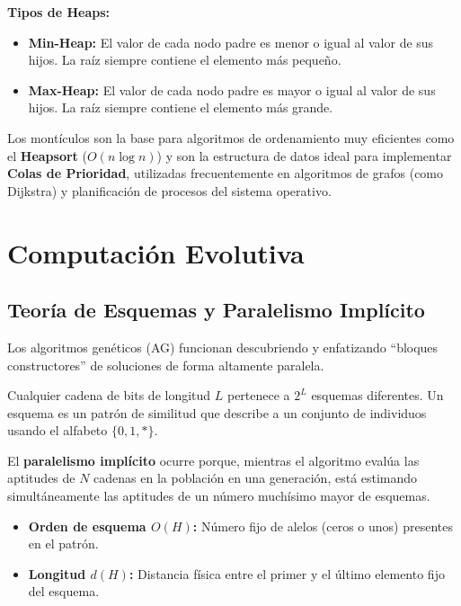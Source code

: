 \documentclass{article}
\begin{document}
	\textbf{Tipos de Heaps:}
	\begin{itemize}
		\item \textbf{Min-Heap:} El valor de cada nodo padre es menor o igual al valor de sus hijos. La raíz siempre contiene el elemento más pequeño.
		\item \textbf{Max-Heap:} El valor de cada nodo padre es mayor o igual al valor de sus hijos. La raíz siempre contiene el elemento más grande.
	\end{itemize}
	
	Los montículos son la base para algoritmos de ordenamiento muy eficientes como el \textbf{Heapsort} ($O(n \log n)$) y son la estructura de datos ideal para implementar \textbf{Colas de Prioridad}, utilizadas frecuentemente en algoritmos de grafos (como Dijkstra) y planificación de procesos del sistema operativo.
	
	
	
	\section{Computación Evolutiva}
	
	\subsection{Teoría de Esquemas y Paralelismo Implícito}
	Los algoritmos genéticos (AG) funcionan descubriendo y enfatizando ``bloques constructores'' de soluciones de forma altamente paralela. 
	
	Cualquier cadena de bits de longitud $L$ pertenece a $2^{L}$ esquemas diferentes. Un esquema es un patrón de similitud que describe a un conjunto de individuos usando el alfabeto $\{0, 1, *\}$. 
	
	El \textbf{paralelismo implícito} ocurre porque, mientras el algoritmo evalúa las aptitudes de $N$ cadenas en la población en una generación, está estimando simultáneamente las aptitudes de un número muchísimo mayor de esquemas.
	
	\begin{itemize}
		\item \textbf{Orden de esquema $O(H)$:} Número fijo de alelos (ceros o unos) presentes en el patrón.
		\item \textbf{Longitud $d(H)$:} Distancia física entre el primer y el último elemento fijo del esquema.
	\end{itemize}
	
\end{document}
